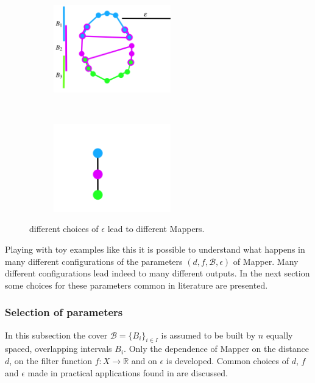 \begin{figure}[!htbp]
\begin{subfigure}[t]{0.4\textwidth}
	\end{subfigure}
	\centering
	
	~ 
	\begin{subfigure}[t]{0.4\textwidth}
		\centering
		\includegraphics[height=1.5in]{torus_approximation_big_colored.png}
		
	\end{subfigure}
	~ 
	\begin{subfigure}[t]{0.4\textwidth}
		\centering
		\includegraphics[height=1.5in]{mapper_of_torus_big.png}
		
	\end{subfigure}
	\caption{different choices of $\epsilon$ lead to different Mappers.}
	\label{fig:epsilon}
\end{figure}

Playing with toy examples like this it is possible to understand what happens in many different configurations of the parameters $(d, f, \mathcal{B}, \epsilon)$ of Mapper. Many different configurations lead indeed to many different outputs. In the next section some choices for these parameters common in literature are presented.

\subsubsection{Selection of parameters}
In this subsection the cover $\mathcal{B} = \{B_i\}_{i \in I}$ is assumed to be built by $n$ equally spaced, overlapping intervals $B_i$. Only the dependence of Mapper on the distance $d$, on the filter function $f : X \rightarrow \mathbb{R}$ and on $\epsilon$ is developed. Common choices of $d$, $f$ and $\epsilon$ made in practical applications found in \cite{extracting_insights}\cite{PAD} are discussed.
